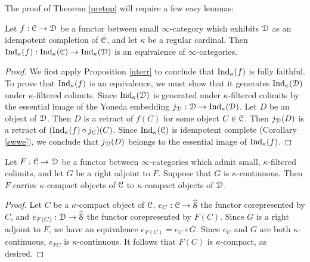 The proof of Theorem \ref{pretop} will require a few easy lemmas:

\begin{lemma}\label{idc}
Let $f: \operatorname{\mathcal{C}} \rightarrow \operatorname{\mathcal{D}}$ be a functor between small $\infty$-category which exhibits
$\operatorname{\mathcal{D}}$ as an idempotent completion of $\operatorname{\mathcal{C}}$, and let $\kappa$ be a regular cardinal. Then
$\operatorname{Ind}_{\kappa}(f): \operatorname{Ind}_{\kappa}(\operatorname{\mathcal{C}}) \rightarrow \operatorname{Ind}_{\kappa}(\operatorname{\mathcal{D}})$ is an equivalence of $\infty$-categories.
\end{lemma}

\begin{proof}
We first apply Proposition \ref{uterr} to conclude that $\operatorname{Ind}_{\kappa}(f)$ is fully faithful. To prove
that $\operatorname{Ind}_{\kappa}(f)$ is an equivalence, we must show that it generates $\operatorname{Ind}_{\kappa}(\operatorname{\mathcal{D}})$ under $\kappa$-filtered colimits. Since $\operatorname{Ind}_{\kappa}(\operatorname{\mathcal{D}})$ is generated under $\kappa$-filtered colimits by the essential image of the Yoneda embedding $j_{\operatorname{\mathcal{D}}}: \operatorname{\mathcal{D}} \rightarrow \operatorname{Ind}_{\kappa}(\operatorname{\mathcal{D}})$. Let $D$ be an object of $\operatorname{\mathcal{D}}$. Then $D$ is a retract of $f(C)$
for some object $C \in \operatorname{\mathcal{C}}$. Then $j_{\operatorname{\mathcal{D}}}(D)$ is a retract of
$(\operatorname{Ind}_{\kappa}(f) \circ j_{\operatorname{\mathcal{C}}})(C)$. Since $\operatorname{Ind}_{\kappa}(\operatorname{\mathcal{C}})$ is idempotent complete
(Corollary \ref{swwe}), we conclude that $j_{\operatorname{\mathcal{D}}}(D)$ belongs to the essential image
of $\operatorname{Ind}_{\kappa}(f)$.
\end{proof}

\begin{lemma}\label{easybumb}
Let $F: \operatorname{\mathcal{C}} \rightarrow \operatorname{\mathcal{D}}$ be a functor between $\infty$-categories which admit
small, $\kappa$-filtered colimits, and let $G$ be a right adjoint to $F$. Suppose
that $G$ is $\kappa$-continuous. Then $F$ carries $\kappa$-compact objects of $\operatorname{\mathcal{C}}$ to $\kappa$-compact objects of $\operatorname{\mathcal{D}}$.
\end{lemma}

\begin{proof}
Let $C$ be a $\kappa$-compact object of $\operatorname{\mathcal{C}}$, $e_{C}: \operatorname{\mathcal{C}} \rightarrow \widehat{\operatorname{\mathcal{S}}}$ the functor corepresented by $C$, and $e_{F(C)}: \operatorname{\mathcal{D}} \rightarrow \widehat{\operatorname{\mathcal{S}}}$ the functor corepresented by $F(C)$. Since $G$ is a right adjoint to $F$, we have an equivalence $e_{F(C)} = e_{C} \circ G$.
Since $e_{C}$ and $G$ are both $\kappa$-continuous, $e_{FC}$ is $\kappa$-continuous.
It follows that $F(C)$ is $\kappa$-compact, as desired.
\end{proof}

